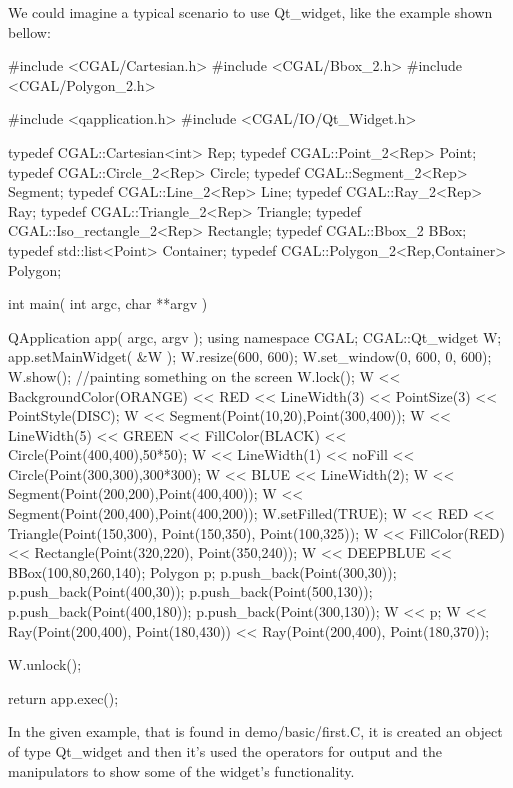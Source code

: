 \ccExample
We could imagine a typical scenario to use Qt\_widget, like the example shown 
bellow:
\begin{ccExampleCode}
#include <CGAL/Cartesian.h>
#include <CGAL/Bbox_2.h>
#include <CGAL/Polygon_2.h>

#include <qapplication.h>
#include <CGAL/IO/Qt_Widget.h>

typedef CGAL::Cartesian<int> Rep;
typedef CGAL::Point_2<Rep> Point;
typedef CGAL::Circle_2<Rep> Circle;
typedef CGAL::Segment_2<Rep> Segment;
typedef CGAL::Line_2<Rep> Line;
typedef CGAL::Ray_2<Rep> Ray;
typedef CGAL::Triangle_2<Rep> Triangle;
typedef CGAL::Iso_rectangle_2<Rep> Rectangle;
typedef CGAL::Bbox_2 BBox;
typedef std::list<Point> Container;
typedef CGAL::Polygon_2<Rep,Container> Polygon;

int main( int argc, char **argv )
{
    QApplication app( argc, argv );
    using namespace CGAL;
    CGAL::Qt_widget W;
    app.setMainWidget( &W );
    W.resize(600, 600);
    W.set_window(0, 600, 0, 600);
    W.show();
    //painting something on the screen
    W.lock();
    W << BackgroundColor(ORANGE) << RED <<
	  LineWidth(3) << PointSize(3) << PointStyle(DISC);
    W << Segment(Point(10,20),Point(300,400));
    W << LineWidth(5) << GREEN << FillColor(BLACK) <<
      Circle(Point(400,400),50*50);
    W << LineWidth(1) << noFill << Circle(Point(300,300),300*300);
    W << BLUE << LineWidth(2);
    W << Segment(Point(200,200),Point(400,400));
    W << Segment(Point(200,400),Point(400,200));
    W.setFilled(TRUE);
    W << RED << Triangle(Point(150,300),
				   Point(150,350),
				   Point(100,325));
    W << FillColor(RED) << Rectangle(Point(320,220),
					       Point(350,240));
    W << DEEPBLUE << BBox(100,80,260,140);
    Polygon p;
    p.push_back(Point(300,30));
    p.push_back(Point(400,30));
    p.push_back(Point(500,130));
    p.push_back(Point(400,180));
    p.push_back(Point(300,130));
    W << p;
    W << Ray(Point(200,400), Point(180,430))
      << Ray(Point(200,400), Point(180,370));
    
    W.unlock();

    return app.exec();
}
\end{ccExampleCode}

In the given example, that is found in demo/basic/first.C, it is created an 
object of type Qt\_widget and then it's used the operators for output and the
manipulators to show some of the widget's functionality.








